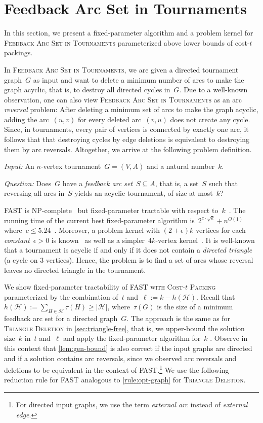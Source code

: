 \documentclass[envcountsame,numbook,smallextended]{svjour3}
\numberwithin{equation}{section}
\numberwithin{figure}{section}
\newcommand{\decprob}[3]{\pagebreak[3]
  \begin{problem}[\boldmath#1]
    \begin{compactdesc}
        \item[\normalfont\it Input:] #2
        \item[\normalfont\it Question:] #3
    \end{compactdesc}
  \end{problem}
}
\newcommand{\packing}{\ensuremath{\mathcal H}}
\newcommand{\FAST}{\textsc{Feedback Arc Set in Tournaments}}
\begin{document}
\section{Feedback Arc Set in Tournaments}
\label{sec:fast}
 
In this section, we present a fixed-parameter algorithm and a problem kernel for \textsc{Feedback Arc Set in Tournaments} parameterized above lower bounds of cost-\(t\) packings. 

In \textsc{Feedback Arc Set in Tournaments}, we are given a directed tournament graph~$G$
as input and want to delete a minimum number of arcs to make the graph acyclic, that is, to destroy all directed cycles
in~$G$. Due to a well-known observation, one can also view \textsc{Feedback Arc Set in Tournaments} as an arc \emph{reversal} problem: After deleting a minimum set of arcs to make the graph acyclic, adding the
arc~$(u,v)$ for every deleted arc~$(v,u)$ does not create any cycle. Since, in
tournaments, every pair of vertices is connected by exactly one arc, it follows that that
destroying cycles by edge deletions is equivalent to destroying them by arc
reversals. Altogether, we arrive at the following problem definition. 
\decprob{\FAST{} (\textsc{FAST})}
{An $n$-vertex tournament~$G=(V,A)$ and a natural number~$k$.}
{Does~$G$ have a \emph{feedback arc set}~$S\subseteq A$, that is, a set~$S$ such that reversing all arcs in~$S$ yields an acyclic tournament, of size at most~$k$?}
\textsc{FAST} is NP-complete~\cite{Alon06} but fixed-parameter
tractable with respect to~$k$~\cite{RS06, DGHNT06, ALS09,Fei09,KS10,FP13}. The running
time of the current best fixed-parameter algorithm is~$2^{c\cdot \sqrt{k}}
+ n^{O(1)}$ where~$c\le 5.24$~\cite{FP13}.
Moreover, a problem kernel with $(2+\epsilon)k$ vertices
for each \emph{constant}~$\epsilon>0$ is known~\cite{BFGPPST11}
as well as a simpler~$4k$-vertex kernel~\cite{PPT16}.
It is well-known that a tournament is acyclic if
and only if it does not contain a \emph{directed triangle} (a cycle on 3
vertices). Hence, the problem is to find a set of arcs whose reversal
leaves no directed triangle in the tournament.

We show fixed-parameter tractability of FAST\textsc{ with Cost-$t$ Packing} parameterized by the combination of~$t$ and~$\ell:=k - h(\packing)$. Recall that $h(\packing):=\sum_{H\in\packing}\tau(H)\ge |\packing|$, where~$\tau(G)$ is the size of a minimum feedback arc set for a directed graph~$G$.
The approach is the same as for \textsc{Triangle Deletion} in \cref{sec:triangle-free}, that is, we upper-bound the solution size~$k$ in~$t$ and~$\ell$ and apply the fixed-parameter algorithm for~$k$ \cite{KS10}. Observe in this context that \cref{lem:gen-bound} is also correct if the input graphs are directed and if a solution contains arc reversals, since we observed arc reversals and deletions to be equivalent in the context of \textsc{FAST}.\footnote{For directed input graphs, we use the term \emph{external arc} instead of \emph{external edge}.}
We use the following reduction rule for \textsc{FAST} analogous to \cref{rule:opt-graph} for \textsc{Triangle Deletion}.
\end{document}
